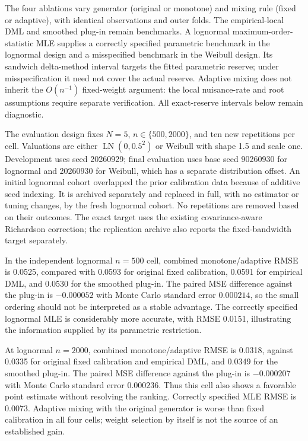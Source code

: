 The four ablations vary generator (original or monotone) and mixing rule
(fixed or adaptive), with identical observations and outer folds. The
empirical-local DML and smoothed plug-in remain benchmarks. A lognormal
maximum-order-statistic MLE supplies a correctly specified parametric
benchmark in the lognormal design and a misspecified benchmark in the
Weibull design. Its sandwich delta-method interval targets the fitted
parametric reserve; under misspecification it need not cover the actual
reserve. Adaptive mixing does not inherit the $O(n^{-1})$ fixed-weight
argument: the local nuisance-rate and root assumptions require separate
verification. All exact-reserve intervals below remain diagnostic.

The evaluation design fixes $N=5$, $n\in\{500,2000\}$, and ten new
repetitions per cell. Valuations are either $\operatorname{LN}(0,0.5^2)$
or Weibull with shape 1.5 and scale one. Development uses seed 20260929;
final evaluation uses base seed 90260930 for lognormal and 20260930 for
Weibull, which has a separate distribution offset. An initial lognormal
cohort overlapped the prior calibration data because of additive seed
indexing. It is archived separately and replaced in full, with no estimator
or tuning changes, by the fresh lognormal cohort. No repetitions are
removed based on their outcomes. The exact
target uses the existing covariance-aware Richardson correction; the
replication archive also reports the fixed-bandwidth target separately.

In the independent lognormal $n=500$ cell, combined monotone/adaptive
RMSE is 0.0525, compared with 0.0593 for original fixed calibration,
0.0591 for empirical DML, and 0.0530 for the smoothed plug-in.
The paired MSE difference against the plug-in is $-0.000052$ with Monte
Carlo standard error $0.000214$, so the small ordering should not be
interpreted as a stable advantage. The correctly specified lognormal MLE is considerably more
accurate, with RMSE 0.0151, illustrating the information supplied by its
parametric restriction.

At lognormal $n=2000$, combined monotone/adaptive RMSE is 0.0318,
against 0.0335 for original fixed calibration and empirical DML, and
0.0349 for the smoothed plug-in. The paired MSE difference against the
plug-in is $-0.000207$ with Monte Carlo standard error $0.000236$.
Thus this cell also shows a favorable point estimate without resolving
the ranking. Correctly specified MLE RMSE is 0.0073. Adaptive mixing with
the original generator is worse than fixed calibration in all four cells;
weight selection by itself is not the source of an established gain.

